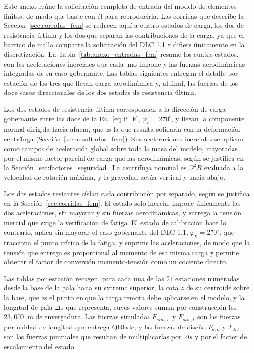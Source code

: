 
Este anexo reúne la solicitación completa de entrada del modelo de elementos finitos, de
modo que baste con él para reproducirla. Las corridas que describe la
Sección~\ref{sec:corridas_fem} se reducen aquí a cuatro estados de carga, los dos de
resistencia última y los dos que separan las contribuciones de la carga, ya que el
barrido de malla comparte la solicitación del DLC 1.1 y difiere únicamente en la
discretización. La Tabla~\ref{tab:anexo_entradas_fem} resume los cuatro estados, con las
aceleraciones inerciales que cada uno impone y las fuerzas aerodinámicas integradas de su
caso gobernante. Las tablas siguientes entregan el detalle por estación de los tres que
llevan carga aerodinámica y, al final, las fuerzas de los doce casos direccionales de los
dos estados de resistencia última.

Los dos estados de resistencia última corresponden a la dirección de carga
gobernante entre las doce de la Ec.~\ref{eq:P_k}, $\varphi_k = 270^\circ$, y llevan la
componente normal dirigida hacia afuera, que es la que resulta solidaria con la
deformación centrífuga (Sección~\ref{sec:resultados_fem}). Sus aceleraciones inerciales
se aplican como campos de aceleración global sobre toda la masa del modelo, mayoradas
por el mismo factor parcial de carga que las aerodinámicas, según se justifica en la
Sección~\ref{sec:factores_seguridad}. La centrífuga nominal es $\Omega^2 R$ evaluada a la
velocidad de rotación máxima, y la gravedad actúa vertical y hacia abajo.

Los dos estados restantes aíslan cada contribución por separado, según se justifica en la
Sección~\ref{sec:corridas_fem}. El estado solo inercial impone únicamente las dos
aceleraciones, sin mayorar y sin fuerzas aerodinámicas, y entrega la tensión inercial que
exige la verificación de fatiga. El estado de calibración hace lo contrario, aplica sin
mayorar el caso gobernante del DLC 1.1, $\varphi_k = 270^\circ$, que tracciona el punto
crítico de la fatiga, y suprime las aceleraciones, de modo que la tensión que entrega es
proporcional al momento de esa misma carga y permite obtener el factor de conversión
momento-tensión como un cociente directo.

Las tablas por estación recogen, para cada una de las $21$ estaciones numeradas desde la
base de la pala hacia su extremo superior, la cota $z$ de su centroide sobre la base, que
es el punto en que la carga remota debe aplicarse en el modelo, y la longitud de pala
$\Delta s$ que representa, cuyos valores suman por construcción los $23{,}000$~m de
envergadura. Las fuerzas simuladas $F_{sim,n}$ y $F_{sim,t}$ son las fuerzas por unidad
de longitud que entrega QBlade, y las fuerzas de diseño $F_{d,n}$ y $F_{d,t}$ son las
fuerzas puntuales que resultan de multiplicarlas por $\Delta s$ y por el factor de
escalamiento del estado.

